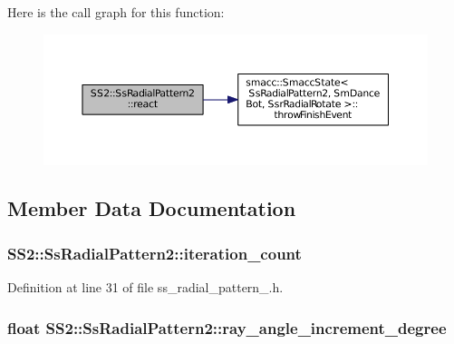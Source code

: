 Here is the call graph for this function\+:
\nopagebreak
\begin{figure}[H]
\begin{center}
\leavevmode
\includegraphics[width=350pt]{structSS2_1_1SsRadialPattern2_a4b87f2b6a408aa65a86d2c8b06efb7cf_cgraph}
\end{center}
\end{figure}




\subsection{Member Data Documentation}
\subsubsection[{\texorpdfstring{iteration\+\_\+count}{iteration_count}}]{ S\+S2\+::\+Ss\+Radial\+Pattern2\+::iteration\+\_\+count}\hypertarget{structSS2_1_1SsRadialPattern2_aeef8ccd002c1bc8709d84072bc1977c7}{}\label{structSS2_1_1SsRadialPattern2_aeef8ccd002c1bc8709d84072bc1977c7}


Definition at line 31 of file ss\+\_\+radial\+\_\+pattern\+\_.\+h.

\subsubsection[{\texorpdfstring{ray\+\_\+angle\+\_\+increment\+\_\+degree}{ray_angle_increment_degree}}]{\setlength{\rightskip}{0pt plus 5cm}float S\+S2\+::\+Ss\+Radial\+Pattern2\+::ray\+\_\+angle\+\_\+increment\+\_\+degree}\hypertarget{structSS2_1_1SsRadialPattern2_af3cd353fad386140d886a6baf1152402}{}\label{structSS2_1_1SsRadialPattern2_af3cd353fad386140d886a6baf1152402}


